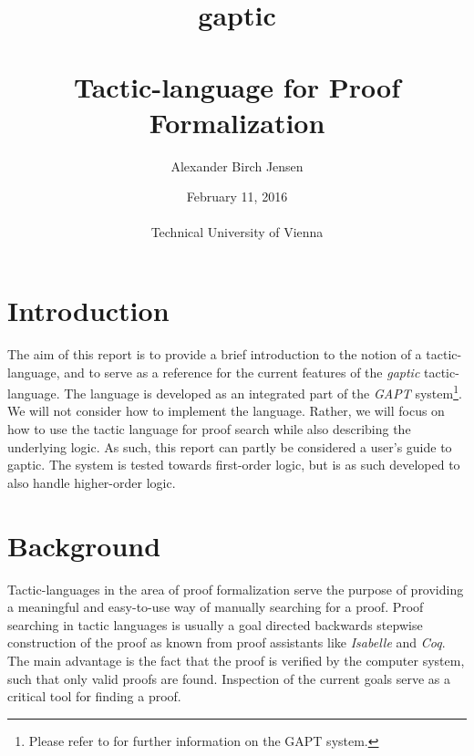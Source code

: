 \documentclass{article}
\begin{document}
\title{\textbf{gaptic}\\~\\
Tactic-language for Proof Formalization}

\author{
Alexander Birch Jensen
}
\date{February 11, 2016\\
\quad \\
Technical University of Vienna}
\maketitle

\pagebreak



\section{Introduction}

The aim of this report is to provide a brief introduction to the notion of a tactic-language, and to serve as a reference for the current features of the \emph{gaptic} tactic-language. The language is developed as an integrated part of the \emph{GAPT} system\footnote{Please refer to \cite{gapt} for further information on the GAPT system.}. We will not consider how to implement the language. Rather, we will focus on how to use the tactic language for proof search while also describing the underlying logic. As such, this report can partly be considered a user's guide to gaptic. The system is tested towards first-order logic, but is as such developed to also handle higher-order logic.

\section{Background}

Tactic-languages in the area of proof formalization serve the purpose of providing a meaningful and easy-to-use way of manually searching for a proof. Proof searching in tactic languages is usually a goal directed backwards stepwise construction of the proof as known from proof assistants like \emph{Isabelle} and \emph{Coq}. The main advantage is the fact that the proof is verified by the computer system, such that only valid proofs are found. Inspection of the current goals serve as a critical tool for finding a proof.
\end{document}
